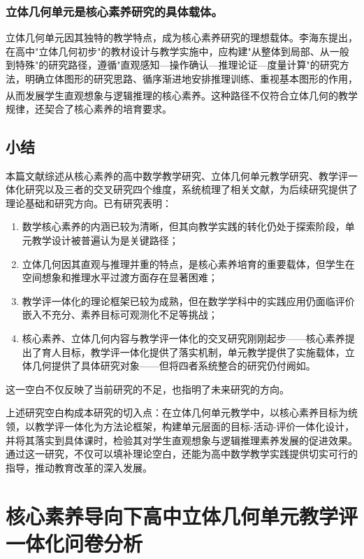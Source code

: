 \documentclass[UTF8,a4paper,12pt,twoside]{ctexart}
\begin{document}
\subsubsection{立体几何单元是核心素养研究的具体载体。}
立体几何单元因其独特的教学特点，成为核心素养研究的理想载体。李海东提出，在高中"立体几何初步"的教材设计与教学实施中，应构建"从整体到局部、从一般到特殊"的研究路径，遵循"直观感知—操作确认—推理论证—度量计算"的研究方法，明确立体图形的研究思路、循序渐进地安排推理训练、重视基本图形的作用，从而发展学生直观想象与逻辑推理的核心素养\textsuperscript{\cite{li2019}}。这种路径不仅符合立体几何的教学规律，还契合了核心素养的培育要求。

\subsection{小结}

本篇文献综述从核心素养的高中数学教学研究、立体几何单元教学研究、教学评一体化研究以及三者的交叉研究四个维度，系统梳理了相关文献，为后续研究提供了理论基础和研究方向。已有研究表明：
\begin{enumerate}
\item 数学核心素养的内涵已较为清晰，但其向教学实践的转化仍处于探索阶段，单元教学设计被普遍认为是关键路径；
\item 立体几何因其直观与推理并重的特点，是核心素养培育的重要载体，但学生在空间想象和推理水平过渡方面存在显著困难；
\item 教学评一体化的理论框架已较为成熟，但在数学学科中的实践应用仍面临评价嵌入不充分、素养目标可观测化不足等挑战；
\item 核心素养、立体几何内容与教学评一体化的交叉研究刚刚起步——核心素养提出了育人目标，教学评一体化提供了落实机制，单元教学提供了实施载体，立体几何提供了具体研究对象——但将四者系统整合的研究仍付阙如。
\end{enumerate}
这一空白不仅反映了当前研究的不足，也指明了未来研究的方向。

上述研究空白构成本研究的切入点：在立体几何单元教学中，以核心素养目标为统领，以教学评一体化为方法论框架，构建单元层面的目标-活动-评价一体化设计，并将其落实到具体课时，检验其对学生直观想象与逻辑推理素养发展的促进效果。通过这一研究，不仅可以填补理论空白，还能为高中数学教学实践提供切实可行的指导，推动教育改革的深入发展。

\section{核心素养导向下高中立体几何单元教学评一体化问卷分析
}
\end{document}
